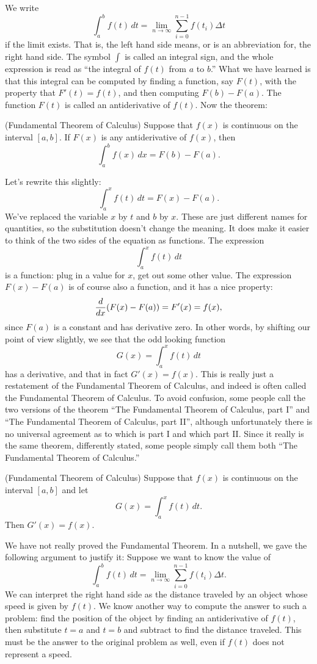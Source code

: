 We write
$$
  \int_a^b f(t)\,dt = \lim_{n\to\infty}\sum_{i=0}^{n-1} f(t_i)\Delta t
$$ 
if the limit exists. That is, the left hand side means, or is an
abbreviation for, the right hand side. The symbol $\int$ is called an
{\dfont integral sign\/}, and the whole
expression is read as ``the integral of $f(t)$ from $a$ to $b$.'' What
we have learned is that this integral can be computed by finding a
function, say $F(t)$, with the property that $F'(t)=f(t)$, and then
computing $F(b)-F(a)$. The function $F(t)$ is called an {\dfont
antiderivative\/} of $f(t)$. Now the theorem:

\thm (Fundamental Theorem of Calculus) 
Suppose that $f(x)$ is
continuous on the interval $[a,b]$. If $F(x)$ is any antiderivative of
$f(x)$, then 
$$
  \int_a^b f(x)\,dx = F(b)-F(a).
$$
\endthmlaterproof

Let's rewrite this slightly: 
$$
  \int_a^x f(t)\,dt = F(x)-F(a).
$$
We've replaced the variable $x$ by $t$ and $b$ by $x$. These are just
different names for quantities, so the substitution doesn't change the
meaning. It does make it easier to think of the two sides of the
equation as functions. The expression
$$
  \int_a^x f(t)\,dt
$$
is a function: plug in a value for $x$, get out some other value. The
expression $F(x)-F(a)$ is of course also a function, and it has a nice
property: 
$$
  {d\over dx} (F(x)-F(a)) = F'(x) = f(x),
$$
since $F(a)$ is a constant and has derivative zero. In other words, by
shifting our point of view slightly, we see that the odd looking
function
$$
  G(x)=\int_a^x f(t)\,dt
$$
has a derivative, and that in fact $G'(x)=f(x)$. This is really just a
restatement of the Fundamental Theorem of Calculus, and indeed is
often called the Fundamental Theorem of Calculus. To avoid confusion,
some people call the two versions of the theorem ``The Fundamental
Theorem of Calculus, part I'' and ``The Fundamental
Theorem of Calculus, part II'', although unfortunately there is no
universal agreement as to which is part I and which part II. Since it
really is the same theorem, differently stated, some people simply
call them both ``The Fundamental
Theorem of Calculus.''

\thm (Fundamental Theorem of Calculus) 
Suppose that $f(x)$ is
continuous on the interval $[a,b]$ and let
$$
  G(x)=\int_a^x f(t)\,dt.
$$
Then $G'(x)=f(x)$.
\endthmlaterproof

We have not really proved the Fundamental Theorem. In a nutshell, we
gave the following argument to justify it: Suppose we want to know the
value of 
$$
  \int_a^b f(t)\,dt = \lim_{n\to\infty}\sum_{i=0}^{n-1} f(t_i)\Delta t.
$$
We can interpret the right hand side as the distance traveled by an
object whose speed is given by $f(t)$. We know another way to compute
the answer to such a problem: find the position of the object by
finding an antiderivative of $f(t)$, then substitute $t=a$ and $t=b$
and subtract to find the distance traveled. This must be the answer to
the original problem as well, even if $f(t)$ does not represent a
speed.

